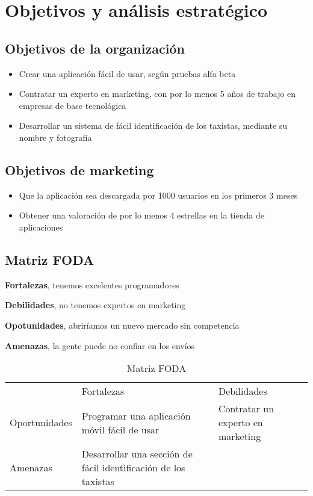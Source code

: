 \chapter{Objetivos y análisis estratégico}

\section{Objetivos de la organización}

\begin{itemize}
\item Crear una aplicación fácil de usar, según pruebas alfa beta
\item Contratar un experto en marketing, con por lo menos 5 años de trabajo en empresas de base tecnológica
\item Desarrollar un sistema de fácil identificación de los taxistas, mediante su nombre y fotografía
\end{itemize}

\section{Objetivos de marketing}

\begin{itemize}
\item Que la aplicación sea descargada por 1000 usuarios en los primeros 3 meses
\item Obtener una valoración de por lo menos 4 estrellas en la tienda de aplicaciones
\end{itemize}

\section{Matriz FODA}

\textbf{Fortalezas}, tenemos excelentes programadores

\textbf{Debilidades}, no tenemos expertos en marketing

\textbf{Opotunidades}, abriríamos un nuevo mercado sin competencia

\textbf{Amenazas}, la gente puede no confiar en los envíos


\begin{table}[]
\centering
\caption{Matriz FODA}
\label{tab:foda}
\begin{tabular}{lll}
              & Fortalezas & Debilidades \\
Oportunidades & Programar una aplicación móvil fácil de usar & Contratar un experto en marketing \\
Amenazas      & Desarrollar una sección de fácil identificación de los taxistas & 
\end{tabular}
\end{table}